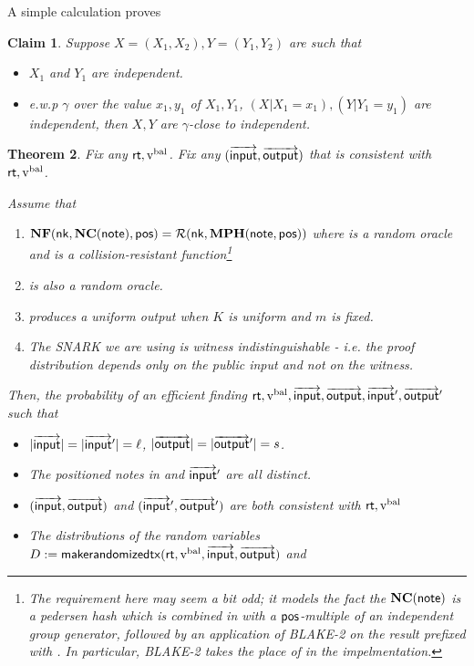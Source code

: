\documentclass[11pt]{article}
\numberwithin{equation}{section} %
\numberwithin{figure}{section} %
\newtheorem{thm}{Theorem}[section]
\newtheorem{claim}[thm]{Claim}
\begin{document}
A simple calculation proves
\begin{claim}\label{clm:close_to_ind}
 Suppose $X=(X_1,X_2), Y=(Y_1,Y_2)$ are such that 
 \begin{itemize}
 \item $X_1$ and $Y_1$ are independent.
  \item 
 e.w.p $\gamma$ over the value $x_1,y_1$ of $X_1,Y_1$, $(X|X_1=x_1), (Y|Y_1 = y_1)$ are independent,
 then $X,Y$ are $\gamma$-close to independent.
 \end{itemize}

 \end{claim}




\begin{thm}\label{thm:indist-sapling}
Fix any $\mathsf{rt},\mathrm{v^{bal}}$.
Fix any $(\overrightarrow{\mathsf{input}},\overrightarrow{\mathsf{output}})$ that is consistent with $\mathsf{rt},\mathrm{v^{bal}}$.

Assume that 
\begin{enumerate}
 \item 
$\mathbf{NF}(\mathsf{nk},\mathbf{NC}(\mathsf{note}),\mathsf{pos})= \mathcal R(\mathsf{nk},\mathbf{MPH}(\mathsf{note},\mathsf{pos}))$ where \RO is a random oracle and \MPH is a collision-resistant function\footnote{The requirement here may seem a bit odd; it models the fact the $\mathbf{NC}(\mathsf{note})$ is a pedersen hash which is combined in \NF with a $\mathsf{pos}$-multiple of an independent group generator, followed by an application of BLAKE-2 on the result prefixed with \nk. In particular, BLAKE-2 takes the place of \RO in the impelmentation.}

\item
\KDF is also a random oracle.
\item {} produces a uniform output when $K$ is uniform and $m$ is fixed.
\item The SNARK we are using is witness indistinguishable - i.e. the proof distribution depends \emph{only} on the public input and not on the witness.
\end{enumerate}


Then, the probability of an efficient \adv finding $\mathsf{rt},\mathrm{v^{bal}},\overrightarrow{\mathsf{input}},\overrightarrow{\mathsf{output}},\overrightarrow{\mathsf{input}}',\overrightarrow{\mathsf{output}}'$
such that
\begin{itemize}
 \item 
$|\overrightarrow{\mathsf{input}}|=|\overrightarrow{\mathsf{input}}'| = \ell$, $|\overrightarrow{\mathsf{output}}|=|\overrightarrow{\mathsf{output}}'| =s $. 
\item The positioned notes in  and $\overrightarrow{\mathsf{input}}'$ are all distinct.
\item $(\overrightarrow{\mathsf{input}},\overrightarrow{\mathsf{output}})$ and $(\overrightarrow{\mathsf{input}}',\overrightarrow{\mathsf{output}}')$ are both consistent with $\mathsf{rt},\mathrm{v^{bal}}$
\item The distributions of the random variables $D:= \mathsf{makerandomizedtx}(\mathsf{rt},\mathrm{v^{bal}},\overrightarrow{\mathsf{input}},\overrightarrow{\mathsf{output}})$ and 


\end{itemize}
\end{thm}
\end{document}
